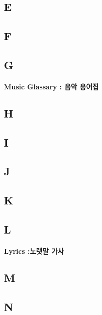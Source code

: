 \documentclass[12pt, a4paper, oneside]{book}
\begin{document}
	\subsection{E}

	\subsection{F}

	\subsection{G}

\paragraph{Music Glassary : 음악 용어집}



	\subsection{H}

	\subsection{I}


	\subsection{J}


	\subsection{K}

	\subsection{L}

\paragraph{Lyrics :노랫말 가사}



	\subsection{M}


	\subsection{N}
\end{document}
